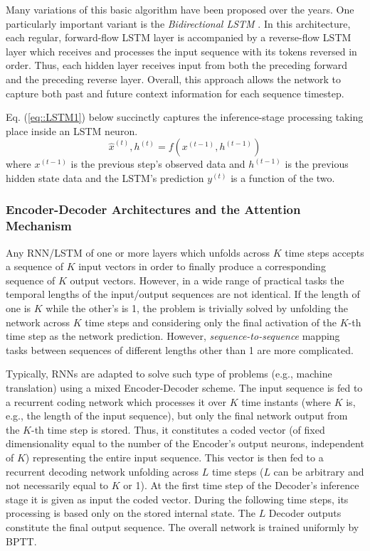 \documentclass[preprint,review,12pt]{elsarticle}
\begin{document}
Many variations of this basic algorithm have been proposed over the years. One particularly important variant is the \textit{Bidirectional LSTM} \cite{biLSTM}. In this architecture, each regular, forward-flow LSTM layer is accompanied by a reverse-flow LSTM layer which receives and processes the input sequence with its tokens reversed in order. Thus, each hidden layer receives input from both the preceding forward and the preceding reverse layer. Overall, this approach allows the network to capture both past and future context information for each sequence timestep.

Eq. (\ref{eq::LSTM1}) below succinctly captures the inference-stage processing taking place inside an LSTM neuron.
\begin{equation}
    \hat{x}^{(t)}, {h}^{(t)} = f(x^{(t-1)}, h^{(t-1)})
\label{eq::LSTM1}
\end{equation}
\noindent where $x^{(t-1)}$ is the previous step's observed data and $h^{(t-1)}$ is the previous hidden state data and the LSTM's prediction ${y}^{(t)}$ is a function of the two.

\subsubsection{Encoder-Decoder Architectures and the Attention Mechanism}
Any RNN/LSTM of one or more layers which unfolds across $K$ time steps accepts a sequence of $K$ input vectors in order to finally produce a corresponding sequence of $K$ output vectors. However, in a wide range of practical tasks the temporal lengths of the input/output sequences are not identical. If the length of one is $K$ while the other's is 1, the problem is trivially solved by unfolding the network across $K$ time steps and considering only the final activation of the $K$-th time step as the network prediction. However, \textit{sequence-to-sequence} mapping tasks between sequences of different lengths other than 1 are more complicated.

Typically, RNNs are adapted to solve such type of problems (e.g., machine translation) using a mixed Encoder-Decoder scheme. The input sequence is fed to a recurrent coding network which processes it over $K$ time instants (where $K$ is, e.g., the length of the input sequence), but only the final network output from the $K$-th time step is stored. Thus, it constitutes a coded vector (of fixed dimensionality equal to the number of the Encoder's output neurons, independent of $K$) representing the entire input sequence. This vector is then fed to a recurrent decoding network unfolding across $L$ time steps ($L$ can be arbitrary and not necessarily equal to $K$ or 1). At the first time step of the Decoder's inference stage it is given as input the coded vector. During the following time steps, its processing is based only on the stored internal state. The $L$ Decoder outputs constitute the final output sequence. The overall network is trained uniformly by BPTT.
\end{document}
